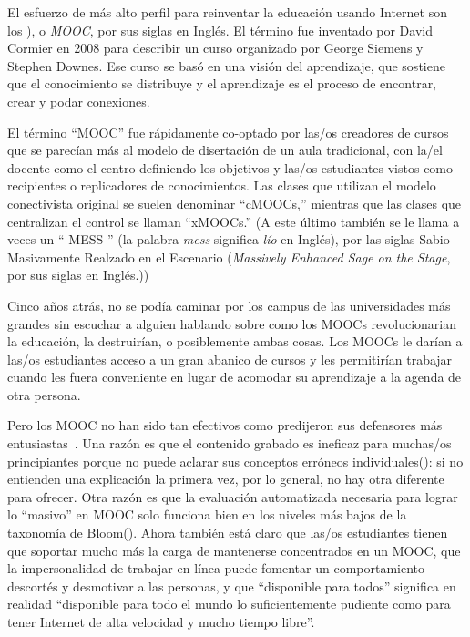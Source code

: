 
El esfuerzo de más alto perfil para reinventar la educación usando Internet
son los ), o \emph{MOOC}, por sus siglas en Inglés.
El término fue inventado por David Cormier en 2008
para describir un curso organizado por George Siemens
y Stephen Downes.
Ese curso se basó en una visión  del aprendizaje,
que sostiene que el conocimiento se distribuye
y el aprendizaje es el proceso de encontrar, crear y podar conexiones.

El término ``MOOC'' fue rápidamente co-optado por las/os creadores de
cursos que se parecían más al modelo de disertación de un aula tradicional,
con la/el docente como el centro definiendo los objetivos
y las/os estudiantes vistos como recipientes o replicadores de conocimientos.
Las clases que utilizan el modelo conectivista original se suelen denominar ``cMOOCs,''
mientras que las clases que centralizan el control se llaman ``xMOOCs.''
(A este último también se le llama a veces un `` MESS '' (la palabra \emph{mess} significa \emph{lío} en Inglés),
por las siglas Sabio Masivamente Realzado en el Escenario (\emph{Massively Enhanced Sage on the Stage}, por sus siglas en Inglés.))

Cinco años atrás,
no se podía caminar por los campus de las universidades más grandes
sin escuchar a alguien hablando sobre como los MOOCs revolucionarian la educación,
la destruirían, 
o posiblemente ambas cosas.
Los MOOCs le darían a las/os estudiantes acceso a un gran abanico de cursos
y les permitirían trabajar cuando les fuera conveniente
en lugar de acomodar su aprendizaje a la agenda de otra persona.

Pero los MOOC no han sido tan efectivos
como predijeron sus defensores más entusiastas~\cite{Ubel2017}.
Una razón es que
el contenido grabado es ineficaz para muchas/os principiantes
porque no puede aclarar sus conceptos erróneos individuales():
si no entienden una explicación la primera vez,
por lo general, no hay otra diferente para ofrecer.
Otra razón es que la evaluación automatizada necesaria para lograr lo ``masivo'' en MOOC
solo funciona bien en los niveles más bajos de la taxonomía de Bloom().
Ahora también está claro que
las/os estudiantes tienen que soportar mucho más la carga de mantenerse concentrados en un MOOC,
que la impersonalidad de trabajar en línea puede fomentar un comportamiento descortés y desmotivar a las personas,
y que ``disponible para todos'' significa en realidad
``disponible para todo el mundo lo suficientemente pudiente como para tener Internet de alta velocidad y mucho tiempo libre''.

